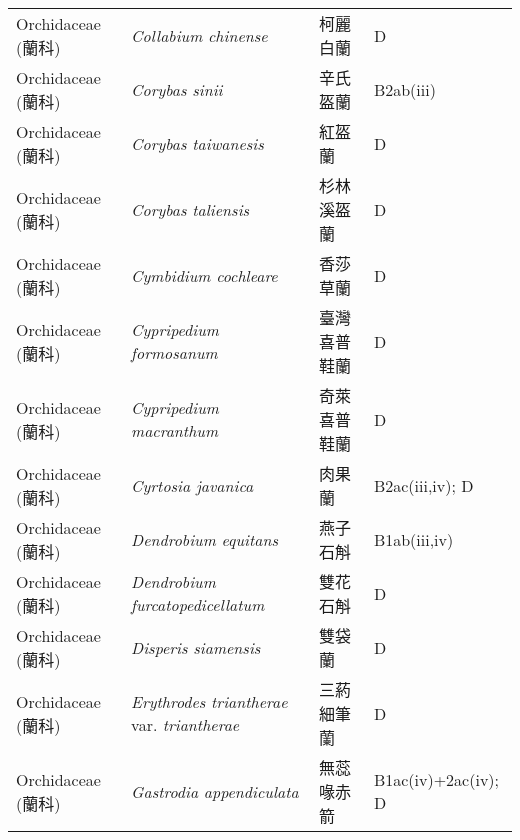 \begin{longtable}{p{3cm}p{5cm}p{3cm}p{4cm}}
    Orchidaceae (蘭科) & \textit{Collabium chinense}  & 柯麗白蘭 & D \index{Collabium@\textit{Collabium}!chinense@\textit{chinense}}  \index{柯麗白蘭} \\
    Orchidaceae (蘭科) & \textit{Corybas sinii}  & 辛氏盔蘭 & B2ab(iii) \index{Corybas@\textit{Corybas}!sinii@\textit{sinii}}  \index{辛氏盔蘭} \\
    Orchidaceae (蘭科) & \textit{Corybas taiwanesis}  & 紅盔蘭 & D \index{Corybas@\textit{Corybas}!taiwanesis@\textit{taiwanesis}}  \index{紅盔蘭} \\
    Orchidaceae (蘭科) & \textit{Corybas taliensis}  & 杉林溪盔蘭 & D \index{Corybas@\textit{Corybas}!taliensis@\textit{taliensis}}  \index{杉林溪盔蘭} \\
    Orchidaceae (蘭科) & \textit{Cymbidium cochleare}  & 香莎草蘭 & D \index{Cymbidium@\textit{Cymbidium}!cochleare@\textit{cochleare}}  \index{香莎草蘭} \\
    Orchidaceae (蘭科) & \textit{Cypripedium formosanum}  & 臺灣喜普鞋蘭 & D \index{Cypripedium@\textit{Cypripedium}!formosanum@\textit{formosanum}}  \index{臺灣喜普鞋蘭} \\
    Orchidaceae (蘭科) & \textit{Cypripedium macranthum}  & 奇萊喜普鞋蘭 & D \index{Cypripedium@\textit{Cypripedium}!macranthum@\textit{macranthum}}  \index{奇萊喜普鞋蘭} \\
    Orchidaceae (蘭科) & \textit{Cyrtosia javanica}  & 肉果蘭 & B2ac(iii,iv); D \index{Cyrtosia@\textit{Cyrtosia}!javanica@\textit{javanica}}  \index{肉果蘭} \\
    Orchidaceae (蘭科) & \textit{Dendrobium equitans}  & 燕子石斛 & B1ab(iii,iv) \index{Dendrobium@\textit{Dendrobium}!equitans@\textit{equitans}}  \index{燕子石斛} \\
    Orchidaceae (蘭科) & \textit{Dendrobium furcatopedicellatum}  & 雙花石斛 & D \index{Dendrobium@\textit{Dendrobium}!furcatopedicellatum@\textit{furcatopedicellatum}}  \index{雙花石斛} \\
    Orchidaceae (蘭科) & \textit{Disperis siamensis}  & 雙袋蘭 & D \index{Disperis@\textit{Disperis}!siamensis@\textit{siamensis}}  \index{雙袋蘭} \\
    Orchidaceae (蘭科) & \textit{Erythrodes triantherae} var. \textit{triantherae}  & 三葯細筆蘭 & D \index{Erythrodes@\textit{Erythrodes}!triantherae@\textit{triantherae}!var. triantherae@var. \textit{triantherae}}  \index{三葯細筆蘭} \\
    Orchidaceae (蘭科) & \textit{Gastrodia appendiculata}  & 無蕊喙赤箭 & B1ac(iv)+2ac(iv); D \index{Gastrodia@\textit{Gastrodia}!appendiculata@\textit{appendiculata}}  \index{無蕊喙赤箭} \\

\end{longtable}
